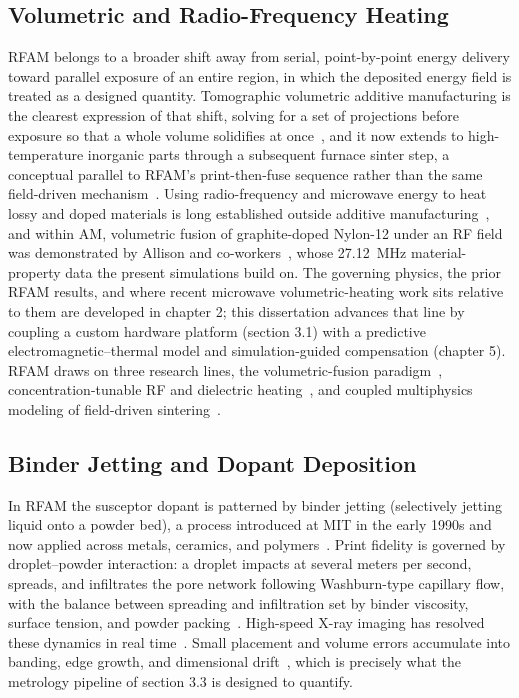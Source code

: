 \subsection{Volumetric and Radio-Frequency Heating}
\label{sec:intro_bg_rf}

RFAM belongs to a broader shift away from serial, point-by-point energy delivery
toward parallel exposure of an entire region, in which the deposited energy field is
treated as a designed quantity. Tomographic volumetric additive manufacturing is the
clearest expression of that shift, solving for a set of projections before exposure so
that a whole volume solidifies at once~\cite{kelly2019volumetric}, and it now extends
to high-temperature inorganic parts through a subsequent furnace sinter step, a
conceptual parallel to RFAM's print-then-fuse sequence rather than the same
field-driven mechanism~\cite{toombs2022silica,madridwolff2023vamreview}.
Using radio-frequency and microwave energy to heat lossy and doped materials is
long established outside additive
manufacturing~\cite{wroe1998rfmicrowave,ferdous2017rfheating}, and within AM,
volumetric fusion of graphite-doped Nylon-12 under an RF field was demonstrated by
Allison and co-workers~\cite{allison2022volumetric,allisonDissertation}, whose
\SI{27.12}{\mega\hertz} material-property data the present simulations build on. The
governing physics, the prior RFAM results, and where recent microwave
volumetric-heating work sits relative to them are developed in chapter 2;
this dissertation advances that line by coupling a custom hardware platform
(section 3.1) with a predictive electromagnetic--thermal model and
simulation-guided compensation (chapter 5). RFAM draws on three research
lines, the volumetric-fusion paradigm~\cite{kelly2019volumetric}, concentration-tunable
RF and dielectric heating~\cite{vashisth2021rfsusceptors}, and coupled multiphysics
modeling of field-driven sintering~\cite{maniere2017coupled}.

\subsection{Binder Jetting and Dopant Deposition}
\label{sec:intro_bg_bjam}

In RFAM the susceptor dopant is patterned by binder jetting (selectively jetting
liquid onto a powder bed), a process introduced at MIT in the early 1990s and now
applied across metals, ceramics, and
polymers~\cite{mostafaei2021binderjetting,miyanaji2016porcelainBJ,du2020ceramicbj}.
Print fidelity is governed by droplet--powder interaction: a droplet impacts at
several meters per second, spreads, and infiltrates the pore network following
Washburn-type capillary flow, with the balance between spreading and infiltration
set by binder viscosity, surface tension, and powder
packing~\cite{Derby2010InkjetReview,colton2021droplet,holman2002spreading,barui2020inkpowder}.
High-speed X-ray imaging has resolved these dynamics in real
time~\cite{parab2019xray}. Small placement and volume errors accumulate into
banding, edge growth, and dimensional drift~\cite{Zhao2023BinderJetDefects,zago2024mbjaccuracy,Thalheim2023DropPlacement},
which is precisely what the metrology pipeline of section 3.3 is designed
to quantify.

